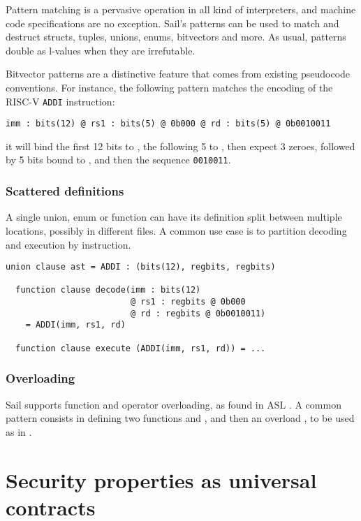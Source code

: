 Pattern matching is a pervasive operation in all kind of interpreters, and machine code specifications are no exception. Sail's patterns can be used to match and destruct structs, tuples, unions, enums, bitvectors and more. As usual, patterns double as l-values when they are irrefutable.

Bitvector patterns are a distinctive feature that comes from existing pseudocode conventions. For instance, the following pattern matches the encoding of the RISC-V \texttt{ADDI} instruction:
\begin{lstlisting}[language=sail]
  imm : bits(12) @ rs1 : bits(5) @ 0b000 @ rd : bits(5) @ 0b0010011
\end{lstlisting}
it will bind the first 12 bits to , the following 5 to , then expect 3 zeroes, followed by 5 bits bound to , and then the sequence \texttt{0010011}.

\subsubsection{Scattered definitions}

A single union, enum or function can have its definition split between multiple locations, possibly in different files. A common use case is to partition decoding and execution by instruction.

\begin{lstlisting}[language=sail]
  union clause ast = ADDI : (bits(12), regbits, regbits)

  function clause decode(imm : bits(12)
                         @ rs1 : regbits @ 0b000
                         @ rd : regbits @ 0b0010011)
    = ADDI(imm, rs1, rd)

  function clause execute (ADDI(imm, rs1, rd)) = ...
\end{lstlisting}

\subsubsection{Overloading}

Sail supports function and operator overloading, as found \eg in ASL \cite{Reid2016}. A common pattern consists in defining two functions  and , and then an overload , to be used as in .

\section{Security properties as universal contracts}
\label{sec:universal-contracts}

